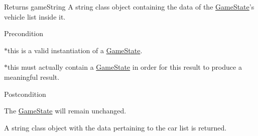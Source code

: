 \begin{DoxyReturn}{\-Returns}
game\-String \-A string class object containing the data of the \hyperlink{class_game_state}{\-Game\-State}'s vehicle list inside it.
\end{DoxyReturn}
\begin{DoxyPrecond}{\-Precondition}

\begin{DoxyEnumerate}
\item $\ast$this is a valid instantiation of a \hyperlink{class_game_state}{\-Game\-State}.
\item $\ast$this must actually contain a \hyperlink{class_game_state}{\-Game\-State} in order for this result to produce a meaningful result.
\end{DoxyEnumerate}
\end{DoxyPrecond}
\begin{DoxyPostcond}{\-Postcondition}

\begin{DoxyEnumerate}
\item \-The \hyperlink{class_game_state}{\-Game\-State} will remain unchanged.
\item \-A string class object with the data pertaining to the car list is returned.
\end{DoxyEnumerate}
\end{DoxyPostcond}

\begin{DoxyCode}
\end{DoxyCode}
 

